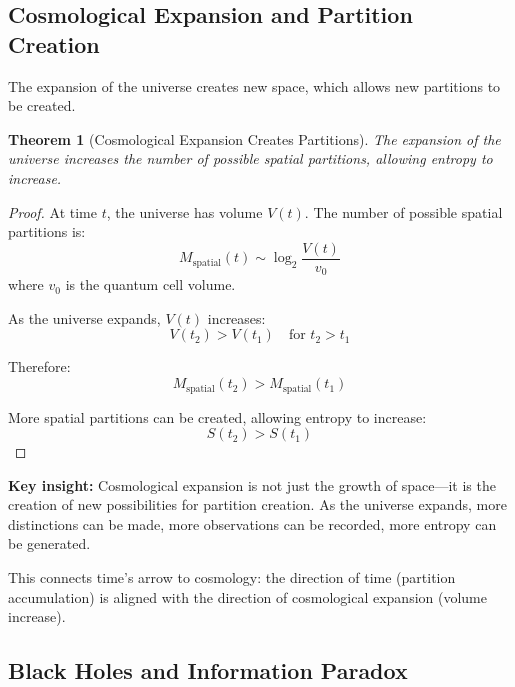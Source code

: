 \documentclass[twocolumn,10pt]{article}
\newtheorem{theorem}{Theorem}[section]
\theoremstyle{definition}
\theoremstyle{remark}
\begin{document}
\subsection{Cosmological Expansion and Partition Creation}

The expansion of the universe creates new space, which allows new partitions to be created.

\begin{theorem}[Cosmological Expansion Creates Partitions]
\label{thm:expansion_creates_partitions}
The expansion of the universe increases the number of possible spatial partitions, allowing entropy to increase.
\end{theorem}

\begin{proof}
At time $t$, the universe has volume $V(t)$. The number of possible spatial partitions is:
\begin{equation}
M_{\text{spatial}}(t) \sim \log_2 \frac{V(t)}{v_0}
\end{equation}
where $v_0$ is the quantum cell volume.

As the universe expands, $V(t)$ increases:
\begin{equation}
V(t_2) > V(t_1) \quad \text{for } t_2 > t_1
\end{equation}

Therefore:
\begin{equation}
M_{\text{spatial}}(t_2) > M_{\text{spatial}}(t_1)
\end{equation}

More spatial partitions can be created, allowing entropy to increase:
\begin{equation}
S(t_2) > S(t_1)
\end{equation}
\end{proof}

\noindent\textbf{Key insight:} Cosmological expansion is not just the growth of space—it is the creation of new possibilities for partition creation. As the universe expands, more distinctions can be made, more observations can be recorded, more entropy can be generated.

\vspace{0.2cm}
\noindent This connects time's arrow to cosmology: the direction of time (partition accumulation) is aligned with the direction of cosmological expansion (volume increase).

\subsection{Black Holes and Information Paradox}
\end{document}
